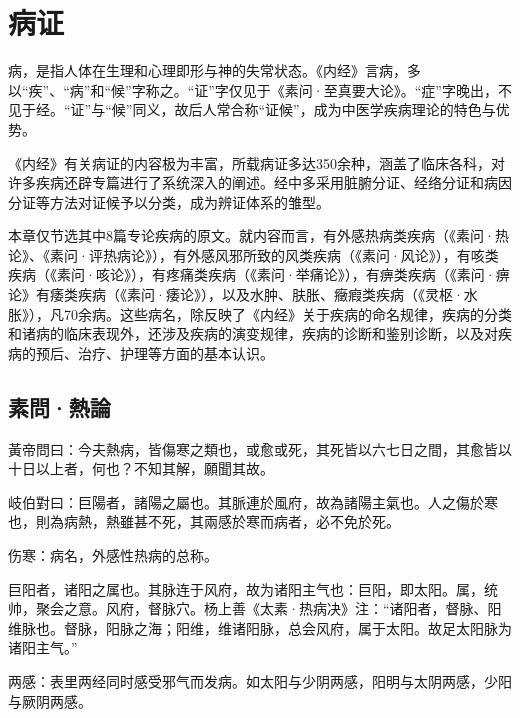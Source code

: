 \documentclass[draft,12pt]{ctexbook}
\begin{document}
\pagestyle{main2}
\fi
\chapter{病证}%

病，是指人体在生理和心理即形与神的失常状态。《内经》言病，多以“疾”、“病”和“候”字称之。“证”字仅见于《素问·至真要大论》。“症”字晚出，不见于经。“证”与“候”同义，故后人常合称“证候”，成为中医学疾病理论的特色与优势。

《内经》有关病证的内容极为丰富，所载病证多达350余种，涵盖了临床各科，对许多疾病还辟专篇进行了系统深入的阐述。经中多采用脏腑分证、经络分证和病因分证等方法对证候予以分类，成为辨证体系的雏型。

本章仅节选其中8篇专论疾病的原文。就内容而言，有外感热病类疾病（《素问·热论》、《素问·评热病论》），有外感风邪所致的风类疾病（《素问·风论》），有咳类疾病（《素问·咳论》），有疼痛类疾病（《素问·举痛论》），有痹类疾病（《素问·痹论》有痿类疾病（《素问·痿论》），以及水肿、肤胀、癥瘕类疾病（《灵枢·水胀》），凡70余病。这些病名，除反映了《内经》关于疾病的命名规律，疾病的分类和诸病的临床表现外，还涉及疾病的演变规律，疾病的诊断和鉴别诊断，以及对疾病的预后、治疗、护理等方面的基本认识。

\section{素問·熱論}%


\begin{yuanwen}
黃帝問曰：今夫熱病，皆傷寒之類也，或愈或死，其死皆以六七日之間，其愈皆以十日以上者，何也？不知其解，願聞其故。

岐伯對曰：巨陽者，諸陽之屬也。其脈連於風府，故為諸陽主氣也。人之傷於寒也，則為病熱，熱雖甚不死，其兩感於寒而病者，必不免於死。
\end{yuanwen}


\begin{jiaozhu}
	\item 伤寒：病名，外感性热病的总称。
	\item 巨阳者，诸阳之属也。其脉连于风府，故为诸阳主气也：巨阳，即太阳。属，统帅，聚会之意。风府，督脉穴。杨上善《太素·热病决》注：“诸阳者，督脉、阳维脉也。督脉，阳脉之海；阳维，维诸阳脉，总会风府，属于太阳。故足太阳脉为诸阳主气。”
	\item 两感：表里两经同时感受邪气而发病。如太阳与少阴两感，阳明与太阴两感，少阳与厥阴两感。
\end{jiaozhu}
\end{document}

